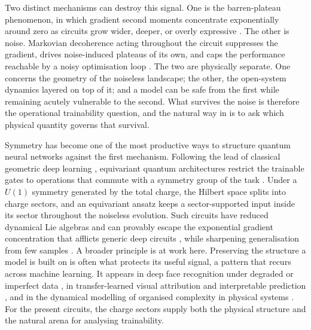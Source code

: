 \documentclass{article}
\begin{document}
Two distinct mechanisms can destroy this signal. One is the barren-plateau phenomenon, in which gradient second moments concentrate exponentially around zero as circuits grow wider, deeper, or overly expressive \cite{mcclean2018,cerezo2021bp,holmes2022,ragone2024}. The other is noise. Markovian decoherence acting throughout the circuit suppresses the gradient, drives noise-induced plateaus of its own, and caps the performance reachable by a noisy optimisation loop \cite{wang2021,stilckfranca2021,sharma2022}. The two are physically separate. One concerns the geometry of the noiseless landscape; the other, the open-system dynamics layered on top of it; and a model can be safe from the first while remaining acutely vulnerable to the second. What survives the noise is therefore the operational trainability question, and the natural way in is to ask which physical quantity governs that survival.

Symmetry has become one of the most productive ways to structure quantum neural networks against the first mechanism. Following the lead of classical geometric deep learning \cite{cohen2016,bronstein2021}, equivariant quantum architectures restrict the trainable gates to operations that commute with a symmetry group of the task \cite{larocca2022groupinv,nguyen2024,schatzki2024,meyer2023,ugail2026}. Under a $U(1)$ symmetry generated by the total charge, the Hilbert space splits into charge sectors, and an equivariant ansatz keeps a sector-supported input inside its sector throughout the noiseless evolution. Such circuits have reduced dynamical Lie algebras and can provably escape the exponential gradient concentration that afflicts generic deep circuits \cite{ragone2024,schatzki2024,pesah2021}, while sharpening generalisation from few samples \cite{caro2022,jerbi2023}. A broader principle is at work here. Preserving the structure a model is built on is often what protects its useful signal, a pattern that recurs across machine learning. It appears in deep face recognition under degraded or imperfect data \cite{ugail2026forensic,elmahmudi2019deep}, in transfer-learned visual attribution and interpretable prediction \cite{ugail2023raphael,ibrahim2025facial}, and in the dynamical modelling of organised complexity in physical systems \cite{ugail2025consciousness}. For the present circuits, the charge sectors supply both the physical structure and the natural arena for analysing trainability.
\end{document}
